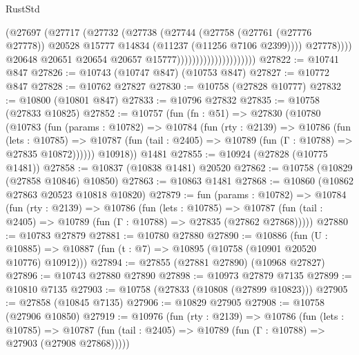 \begin{lexlean}{RustStd}
\begin{coremodule}
                                              (@27697
                                                (@27717
                                                  (@27732
                                                    (@27738
                                                      (@27744
                                                        (@27758
                                                          (@27761 (@27776 @27778))
                                                          @20528
                                                          @15777
                                                          @14834
                                                          (@11237 (@11256 @7106 @2399))))
                                                      @27778))))
                                              @20648
                                              @20651
                                              @20654
                                              @20657
                                              @15777)))))))))))))))))))))
@27822 := @10741 @847
@27826 := @10743 (@10747 @847) (@10753 @847)
@27827 := @10772 @847
@27828 := @10762 @27827
@27830 := @10758 (@27828 @10777)
@27832 := @10800 (@10801 @847)
@27833 := @10796 @27832
@27835 := @10758 (@27833 @10825)
@27852 := @10757
    (fun (fn : @51) =>
    @27830
      (@10780
        (@10783
          (fun (params : @10782) =>
          @10784
            (fun (rty : @2139) =>
            @10786
              (fun (lets : @10785) =>
              @10787 (fun (tail : @2405) => @10789 (fun (Γ : @10788) => @27835 @10872))))))
        @10918))
    @1481
@27855 := @10924 (@27828 (@10775 @1481))
@27858 := @10837 (@10838 @1481) @20520
@27862 := @10758 (@10829 (@27858 @10846) @10850)
@27863 := @10863 @1481
@27868 := @10860 (@10862 @27863 @20523 @10818 @10820)
@27879 := fun (params : @10782) =>
  @10784
    (fun (rty : @2139) =>
    @10786
      (fun (lets : @10785) =>
      @10787 (fun (tail : @2405) => @10789 (fun (Γ : @10788) => @27835 (@27862 @27868)))))
@27880 := @10783 @27879
@27881 := @10780 @27880
@27890 := @10886
    (fun (U : @10885) => @10887 (fun (t : @7) => @10895 (@10758 (@10901 @20520 @10776) @10912)))
@27894 := @27855 (@27881 @27890) (@10968 @27827)
@27896 := @10743 @27880 @27890
@27898 := @10973 @27879 @7135
@27899 := @10810 @7135
@27903 := @10758 (@27833 (@10808 (@27899 @10823)))
@27905 := @27858 (@10845 @7135)
@27906 := @10829 @27905
@27908 := @10758 (@27906 @10850)
@27919 := @10976
    (fun (rty : @2139) =>
    @10786
      (fun (lets : @10785) =>
      @10787 (fun (tail : @2405) => @10789 (fun (Γ : @10788) => @27903 (@27908 @27868)))))

\end{coremodule}
\end{lexlean}
